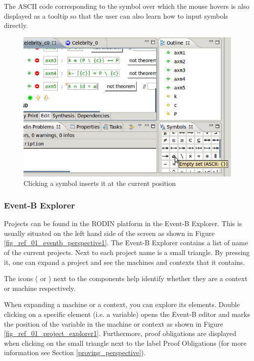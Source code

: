 The ASCII code corresponding to the symbol over which the mouse hovers is also displayed as a tooltip so that the user can also learn how to input symbols directly. 

\begin{figure}[!ht]
\begin{center}
	\includegraphics{img/reference/ref_01_symbol_table1.png}
	\caption{Clicking a symbol inserts it at the current position}
	\label{fig_ref_01_symbol_table1}
\end{center}
\end{figure}

\subsubsection{Event-B Explorer}
\label{eventb_explorer}

Projects can be found in the RODIN platform in the \textsf{Event-B Explorer}. This is usually situated on the left hand side of the screen as shown in Figure \ref{fig_ref_01_eventb_perspective1}. The \textsf{Event-B Explorer} contains a list of name of the current projects. Next to each project name is a small triangle. By pressing it, one can expand a project and see the machines and contexts that it contains.

The icons ( or ) next to the components help identify whether they are a context or machine respectively.

When expanding a machine or a context, you can explore its elements. Double clicking on a specific element (i.e. a variable) opens the Event-B editor and marks the position of the variable in the machine or context as shown in Figure \ref{fig_ref_01_project_explorer1}. Furthermore, proof obligations are displayed when clicking on the small triangle next to the label \textsf{Proof Obligations} (for more information see Section \ref{proving_perspective}).

